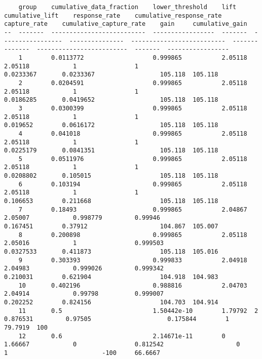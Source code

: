 \documentclass[11pt]{article}
\begin{document}
    
    \begin{verbatim}
    group    cumulative_data_fraction    lower_threshold    lift     cumulative_lift    response_rate    cumulative_response_rate    capture_rate    cumulative_capture_rate    gain     cumulative_gain
--  -------  --------------------------  -----------------  -------  -----------------  ---------------  --------------------------  --------------  -------------------------  -------  -----------------
    1        0.0113772                   0.999865           2.05118  2.05118            1                1                           0.0233367       0.0233367                  105.118  105.118
    2        0.0204591                   0.999865           2.05118  2.05118            1                1                           0.0186285       0.0419652                  105.118  105.118
    3        0.0300399                   0.999865           2.05118  2.05118            1                1                           0.019652        0.0616172                  105.118  105.118
    4        0.041018                    0.999865           2.05118  2.05118            1                1                           0.0225179       0.0841351                  105.118  105.118
    5        0.0511976                   0.999865           2.05118  2.05118            1                1                           0.0208802       0.105015                   105.118  105.118
    6        0.103194                    0.999865           2.05118  2.05118            1                1                           0.106653        0.211668                   105.118  105.118
    7        0.18493                     0.999865           2.04867  2.05007            0.998779         0.99946                     0.167451        0.37912                    104.867  105.007
    8        0.200898                    0.999865           2.05118  2.05016            1                0.999503                    0.0327533       0.411873                   105.118  105.016
    9        0.303393                    0.999833           2.04918  2.04983            0.999026         0.999342                    0.210031        0.621904                   104.918  104.983
    10       0.402196                    0.988816           2.04703  2.04914            0.99798          0.999007                    0.202252        0.824156                   104.703  104.914
    11       0.5                         1.50442e-10        1.79792  2                  0.876531         0.97505                     0.175844        1                          79.7919  100
    12       0.6                         2.14671e-11        0        1.66667            0                0.812542                    0               1                          -100     66.6667

\end{verbatim}
\end{document}
